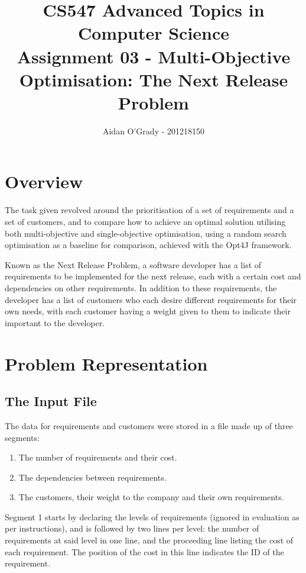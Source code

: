 \documentclass[11pt, a4paper]{article}
\begin{document}
\title{CS547 Advanced Topics in Computer Science\\
\large{Assignment 03 - Multi-Objective Optimisation: The Next Release Problem}}
\author{Aidan O'Grady - 201218150}
\date{}
\maketitle

\section{Overview}
\label{sec:overview}
The task given revolved around the prioritisation of a set of requirements and
a set of customers, and to compare how to achieve an optimal solution utilising
both multi-objective and single-objective optimisation, using a random search
optimisation as a baseline for comparison, achieved with the Opt4J framework.

Known as the Next Release Problem, a software developer has a list of
requirements to be implemented for the next release, each with a certain cost
and dependencies on other requirements. In addition to these requirements, the
developer has a list of customers who each desire different requirements for
their own needs, with each customer having a weight given to them to indicate
their important to the developer.

\section{Problem Representation}
\label{sec:problem_representation}
\subsection{The Input File} %
\label{sub:the_input_file}
The data for requirements and customers were stored in a file made up of three
segments:

\begin{enumerate}
    \item The number of requirements and their cost.
    \item The dependencies between requirements.
    \item The customers, their weight to the company and their own requirements.
\end{enumerate}

Segment 1 starts by declaring the levels of requirements (ignored in evaluation
as per instructions), and is followed by two lines per level: the number of
requirements at said level in one line, and the proceeding line listing the cost
of each requirement. The position of the cost in this line indicates the ID of
the requirement.
\end{document}
